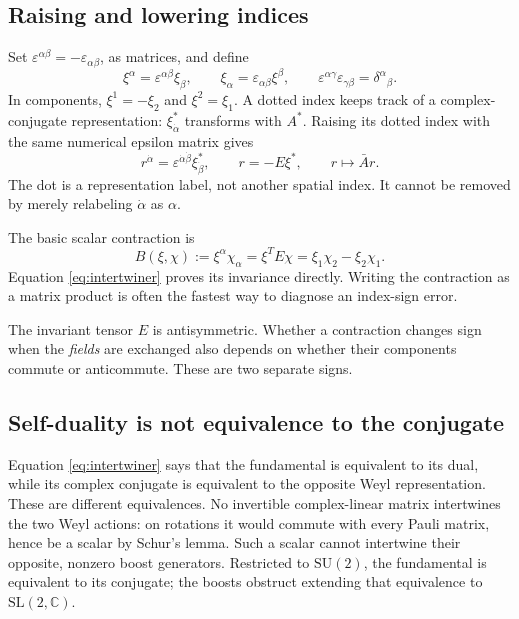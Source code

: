 \documentclass[11pt]{article}
\newcommand{\C}{\mathbb C}
\newcommand{\SU}{\mathrm{SU}}
\newcommand{\SL}{\mathrm{SL}}
\newcommand{\eps}{\varepsilon}
\begin{document}
\subsection{Raising and lowering indices}
Set \(\eps^{\alpha\beta}=-\eps_{\alpha\beta}\), as matrices, and define
\begin{equation}
 \xi^\alpha=\eps^{\alpha\beta}\xi_\beta,\qquad
 \xi_\alpha=\eps_{\alpha\beta}\xi^\beta,
 \qquad \eps^{\alpha\gamma}\eps_{\gamma\beta}
       =\delta^\alpha{}_{\beta}.
 \label{eq:raise}
\end{equation}
In components, \(\xi^1=-\xi_2\) and \(\xi^2=\xi_1\).
A dotted index keeps track of a complex-conjugate representation:
\(\xi^*_{\dot\alpha}\) transforms with \(A^*\). Raising its dotted
index with the same numerical epsilon matrix gives
\begin{equation}
 r^{\dot\alpha}=\eps^{\dot\alpha\dot\beta}\xi^*_{\dot\beta},
 \qquad r=-E\xi^*,\qquad r\mapsto\bar A r.
 \label{eq:r}
\end{equation}
The dot is a representation label, not another spatial index. It cannot
be removed by merely relabeling \(\dot\alpha\) as \(\alpha\).

The basic scalar contraction is
\begin{equation}
 B(\xi,\chi):=\xi^\alpha\chi_\alpha
    =\xi^T E\chi=\xi_1\chi_2-\xi_2\chi_1.
 \label{eq:B}
\end{equation}
Equation \eqref{eq:intertwiner} proves its invariance directly.
Writing the contraction as a matrix product is often the fastest way
to diagnose an index-sign error.

\begin{warningbox}
The invariant tensor \(E\) is antisymmetric. Whether a contraction
changes sign when the \emph{fields} are exchanged also depends on whether
their components commute or anticommute. These are two separate signs.
\end{warningbox}


\subsection{Self-duality is not equivalence to the conjugate}
Equation \eqref{eq:intertwiner} says that the fundamental is equivalent
to its dual, while its complex conjugate is equivalent to the opposite
Weyl representation. These are different equivalences.
No invertible complex-linear matrix intertwines the two Weyl actions:
on rotations it would commute with every Pauli matrix, hence be a scalar
by Schur's lemma. Such a scalar cannot intertwine their opposite,
nonzero boost generators. Restricted to \(\SU(2)\), the fundamental
is equivalent to its conjugate; the boosts obstruct extending that
equivalence to \(\SL(2,\C)\).
\end{document}
